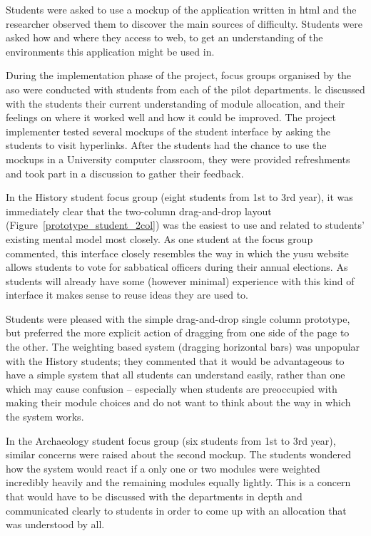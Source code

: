 Students were asked to use a mockup of the application written in \gls{html}
and the researcher observed them to discover the main sources of difficulty.
Students were asked how and where they access to web, to get an understanding
of the environments this application might be used in.

During the implementation phase of the project, focus groups organised by the
\gls{aso} were conducted with students from each of the pilot departments.
\gls{lc} discussed with the students their current understanding of module
allocation, and their feelings on where it worked well and how it could be
improved. The project implementer tested several mockups of the student
interface by asking the students to visit hyperlinks. After the students had
the chance to use the mockups in a University computer classroom, they were
provided refreshments and took part in a discussion to gather their feedback.

In the History student focus group (eight students from 1st to 3rd year), it
was immediately clear that the two-column drag-and-drop layout
(Figure~\ref{prototype_student_2col}) was the easiest to use and related to
students' existing mental model most closely. As one student at the focus
group commented, this interface closely resembles the way in which the
\gls{yusu} website allows students to vote for sabbatical officers during
their annual elections. As students will already have some (however minimal)
experience with this kind of interface it makes sense to reuse ideas they are
used to.

Students were pleased with the simple drag-and-drop single column prototype,
but preferred the more explicit action of dragging from one side of the page
to the other. The weighting based system (dragging horizontal bars) was
unpopular with the History students; they commented that it would be
advantageous to have a simple system that all students can understand easily,
rather than one which may cause confusion -- especially when students are
preoccupied with making their module choices and do not want to think about
the way in which the system works.

In the Archaeology student focus group (six students from 1st to 3rd year),
similar concerns were raised about the second mockup. The students wondered
how the system would react if a only one or two modules were weighted
incredibly heavily and the remaining modules equally lightly. This is a
concern that would have to be discussed with the departments in depth and
communicated clearly to students in order to come up with an allocation that
was understood by all.

